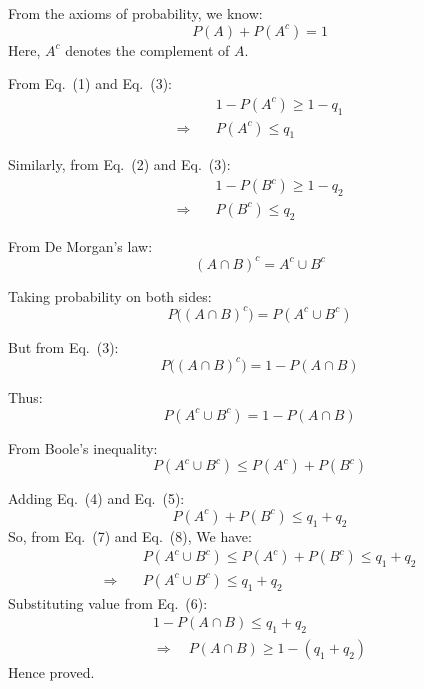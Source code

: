 \documentclass[12pt]{article}
\begin{document}
From the axioms of probability, we know:
\begin{equation}
    P(A) + P(A^c) = 1
    \tag{3}
\end{equation}
Here, $A^c$ denotes the complement of $A$.

From Eq.~(1) and Eq.~(3):
\begin{equation}
\begin{aligned}
& 1 - P(A^c) \ge 1 - q_1 \\
\Rightarrow\quad & P(A^c) \le q_1
\end{aligned}
\tag{4}
\end{equation}
    

Similarly, from Eq.~(2) and Eq.~(3):
\begin{equation}
\begin{aligned}
&1 - P(B^c) \ge 1 - q_2 \\
\Rightarrow\quad &P(B^c) \le q_2
\end{aligned}
\tag{5}
\end{equation}

From De Morgan's law:
\[
    (A \cap B)^c = A^c \cup B^c
\]

Taking probability on both sides:
\[
    P\big((A \cap B)^c\big) = P(A^c \cup B^c)
\]

But from Eq.~(3):
\[
    P\big((A \cap B)^c\big) = 1 - P(A \cap B)
\]

Thus:
\begin{equation}
        P(A^c \cup B^c) = 1 - P(A \cap B)
        \tag{6}
\end{equation}

From Boole's inequality:
\begin{equation}
        P(A^c \cup B^c) \le P(A^c) + P(B^c)
        \tag{7}
\end{equation}

Adding Eq.~(4) and Eq.~(5):
\begin{equation}
        P(A^c) + P(B^c) \le q_1 + q_2
        \tag{8}
\end{equation}
So, from Eq.~(7) and Eq.~(8), We have:
\[
\begin{aligned}
& P(A^c \cup B^c) \le P(A^c) + P(B^c) \le q_1 + q_2 \\
\Rightarrow\quad & P(A^c \cup B^c) \le q_1 + q_2
\end{aligned}
\]
Substituting value from Eq.~(6):
\[
\begin{aligned}
1 - P(A \cap B) \le q_1 + q_2 \\
\Rightarrow\quad P(A \cap B) \ge 1 - (q_1 + q_2)    
\end{aligned}
\]
Hence proved.
\end{document}
